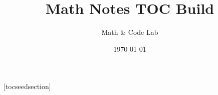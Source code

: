 \documentclass[12pt]{article}
\title{Math Notes TOC Build}
\author{Math & Code Lab}
\date{\today}
\begin{document}

\tableofcontents

[tocseedsection]
\newcommand{\SeedSection}[1]{
  \refstepcounter{tocseedsection}
  \setcounter{tocseedsubsection}{0}
  \addcontentsline{toc}{section}{\protect\numberline{\arabic{tocseedsection}}#1}
}
\newcommand{\SeedSubsection}[1]{
  \refstepcounter{tocseedsubsection}
  \addcontentsline{toc}{subsection}{\protect\numberline{\arabic{tocseedsection}.\arabic{tocseedsubsection}}#1}
}

\end{document}
